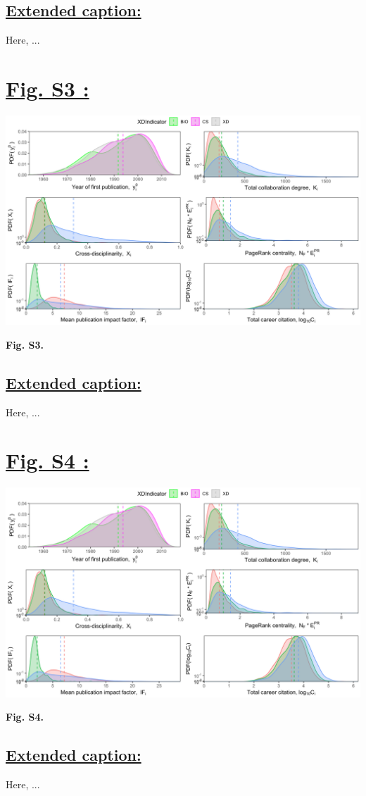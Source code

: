 \documentclass{article}\usepackage[]{graphicx}\usepackage[]{color}
\begin{document}
\subsection*{\underline{Extended caption:}}
\par{Here, ...}

\newpage
\section*{\underline{Fig. S3 :}}
\begin{center}
\includegraphics[scale=0.4]{3_ggplot.png}
\newline
\par{\textbf{Fig. S3.}}
\end{center}
\subsection*{\underline{Extended caption:}}
\par{Here, ...}

\newpage
\section*{\underline{Fig. S4 :}}
\begin{center}
\includegraphics[scale=0.4]{3_ggplot.png}
\newline
\par{\textbf{Fig. S4.}}
\end{center}
\subsection*{\underline{Extended caption:}}
\par{Here, ...}
\end{document}
